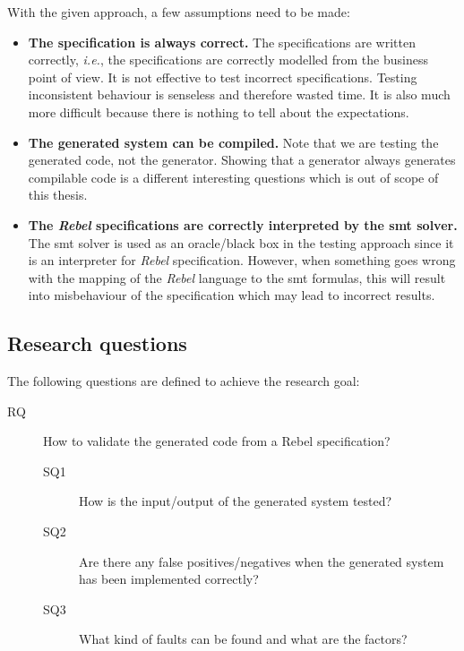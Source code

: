 With the given approach, a few assumptions need to be made:
\begin{itemize}
\item \textbf{The specification is always correct.}
The specifications are written correctly, \textit{i.e.}, the specifications are
correctly modelled from the business point of view.
It is not effective to test incorrect specifications. Testing
inconsistent behaviour is senseless and therefore wasted time. It is also much
more difficult because there is nothing to tell about the expectations.
\item \textbf{The generated system can be compiled.} Note that we are testing
the generated code, not the generator. Showing that a generator always generates
compilable code is a different interesting questions which is out of scope of
this thesis.
\item \textbf{The \textit{Rebel} specifications are correctly interpreted by the \gls{smt}
solver.} The \gls{smt} solver is used as an oracle/black box in the testing approach
since it is an interpreter for \textit{Rebel} specification. However, when
something goes wrong with the mapping of the \textit{Rebel} language to the \gls{smt}
formulas, this will result into misbehaviour of the specification which may lead
to incorrect results.
\end{itemize}

\subsection{Research questions}\label{sec:research-questions}
The following questions are defined to achieve the research goal:

\begin{description}
  \item [RQ] How to validate the generated code from a Rebel specification?

  \begin{description}
    \item [SQ1] How is the input/output of the generated system tested?
    \item [SQ2] Are there any false positives/negatives when the generated
    system has been implemented correctly?
    \item [SQ3] What kind of faults can be found and what are the factors?
  \end{description}

\end{description}

